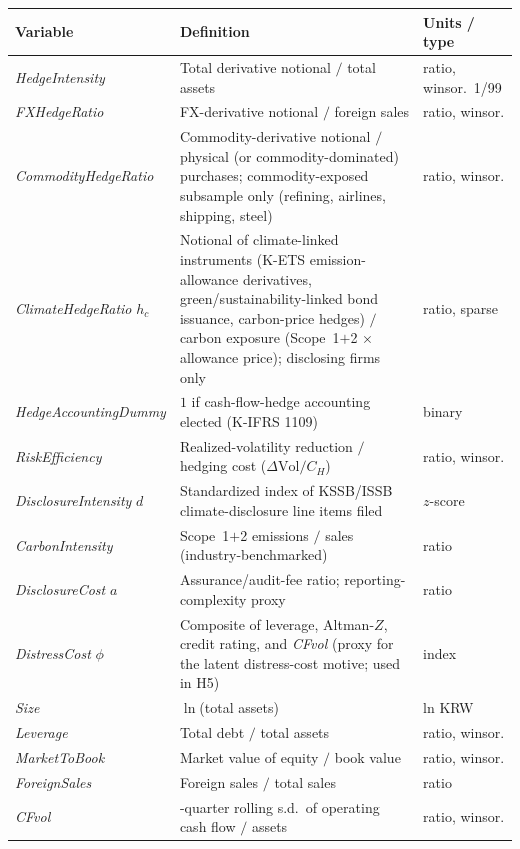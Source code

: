 \documentclass[11pt,a4paper]{article}
\begin{document}
\begin{table}[h]
\centering
\begin{tabular}{>{\raggedright\arraybackslash}p{4.4cm} >{\raggedright\arraybackslash}p{6.3cm} >{\raggedright\arraybackslash}p{2.6cm}}
\toprule
Variable & Definition & Units / type \\
\midrule
\emph{HedgeIntensity} & Total derivative notional $/$ total assets & ratio, winsor.\ 1/99 \\
\emph{FXHedgeRatio} & FX-derivative notional $/$ foreign sales & ratio, winsor. \\
\emph{CommodityHedgeRatio} & Commodity-derivative notional $/$ physical (or commodity-dominated) purchases; commodity-exposed subsample only (refining, airlines, shipping, steel) & ratio, winsor. \\
\emph{ClimateHedgeRatio} $h_c$ & Notional of climate-linked instruments (K-ETS emission-allowance derivatives, green/sustainability-linked bond issuance, carbon-price hedges) $/$ carbon exposure (Scope~1$+$2 $\times$ allowance price); disclosing firms only & ratio, sparse \\
\emph{HedgeAccountingDummy} & $1$ if cash-flow-hedge accounting elected (K-IFRS 1109) & binary \\
\emph{RiskEfficiency} & Realized-volatility reduction $/$ hedging cost ($\Delta\mathrm{Vol}/C_H$) & ratio, winsor. \\
\emph{DisclosureIntensity} $d$ & Standardized index of KSSB/ISSB climate-disclosure line items filed & $z$-score \\
\emph{CarbonIntensity} & Scope~1$+$2 emissions $/$ sales (industry-benchmarked) & ratio \\
\emph{DisclosureCost} $a$ & Assurance/audit-fee ratio; reporting-complexity proxy & ratio \\
\emph{DistressCost} $\phi$ & Composite of leverage, Altman-$Z$, credit rating, and \emph{CFvol} (proxy for the latent distress-cost motive; used in H5) & index \\
\emph{Size} & $\ln$(total assets) & ln KRW \\
\emph{Leverage} & Total debt $/$ total assets & ratio, winsor. \\
\emph{MarketToBook} & Market value of equity $/$ book value & ratio, winsor. \\
\emph{ForeignSales} & Foreign sales $/$ total sales & ratio \\
\emph{CFvol} & 12-quarter rolling s.d.\ of operating cash flow $/$ assets & ratio, winsor. \\

\end{tabular}
\end{table}
\end{document}
